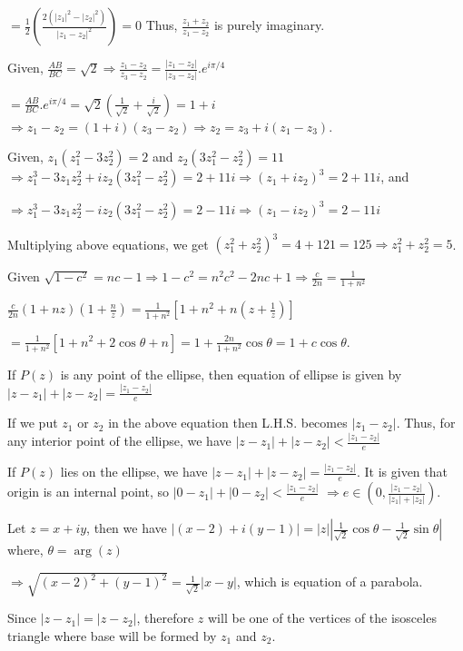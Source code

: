  $= \frac{1}{2}\left(\frac{2(|z_1|^2 - |z_2|^2)}{|z_1 - z_2|^2}\right) = 0$
  Thus, $\frac{z_1 + z_2}{z_1 - z_2}$ is purely imaginary.
\item Given, $\frac{AB}{BC} = \sqrt{2} \Rightarrow \frac{z_1 - z_2}{z_3 - z_2} = \frac{|z_1 - z_2|}{|z_3 -
  z_2|}.e^{i\pi/4}$

  $= \frac{AB}{BC}.e^{i\pi/4} = \sqrt{2}\left(\frac{1}{\sqrt{2}} + \frac{i}{\sqrt{2}}\right) = 1 + i$
  $\Rightarrow z_1 - z_2 = (1 + i)(z_3 - z_2) \Rightarrow z_2 = z_3 + i(z_1 - z_3)$.
\item Given, $z_1(z_1^2 - 3z_2^2) = 2$ and $z_2(3z_1^2 - z_2^2) = 11$
  $\Rightarrow z_1^3 - 3z_1z_2^2 + iz_2(3z_1^2 - z_2^2) = 2 + 11i \Rightarrow (z_1 + iz_2)^3 = 2 + 11i$, and

  $\Rightarrow z_1^3 - 3z_1z_2^2 - iz_2(3z_1^2 - z_2^2) = 2 - 11i \Rightarrow (z_1 - iz_2)^3 = 2 - 11i$

  Multiplying above equations, we get
  $(z_1^2 + z_2^2)^3 = 4 + 121 = 125 \Rightarrow z_1^2 + z_2^2 = 5$.
\item Given $\sqrt{1 - c^2} = nc - 1 \Rightarrow 1 - c^2 = n^2c^2 - 2nc + 1 \Rightarrow \frac{c}{2n} =
  \frac{1}{1 + n^2}$

  $\frac{c}{2n}(1 + nz)\left(1 + \frac{n}{z}\right) = \frac{1}{1 + n^2}\left[1 + n^2 + n\left(z +
    \frac{1}{z}\right)\right]$

  $= \frac{1}{1 + n^2}\left[1 + n^2 + 2\cos\theta + n\right] = 1 + \frac{2n}{1 + n^2}\cos\theta = 1 +
  c\cos\theta$.
\item If $P(z)$ is any point of the ellipse, then equation of ellipse is given by
  $|z - z_1| + |z- z_2| = \frac{|z_1 - z_2|}{e}$

  If we put $z_1$ or $z_2$ in the above equation then L.H.S. becomes $|z_1 - z_2|$.
  Thus, for any interior point of the ellipse, we have $|z - z_1| + |z - z_2| < \frac{|z_1 - z_2|}{e}$

  If $P(z)$ lies on the ellipse, we have $|z - z_1| + |z- z_2| = \frac{|z_1 - z_2|}{e}$.
  It is given that origin is an internal point, so
  $|0 - z_1| + |0 - z_2| < \frac{|z_1 - z_2|}{e}$
  $\Rightarrow e\in\left(0, \frac{|z_1 - z_2|}{|z_1| + |z_2|}\right)$.
\item Let $z = x + iy$, then we have
  $|(x - 2) + i(y - 1)| = |z|\left|\frac{1}{\sqrt{2}}\cos\theta - \frac{1}{\sqrt{2}}\sin\theta\right|$
  where, $\theta = \arg(z)$

  $\Rightarrow \sqrt{(x - 2)^2 + (y - 1)^2} = \frac{1}{\sqrt{2}}|x - y|$,
  which is equation of a parabola.
\item Since $|z - z_1| = |z - z_2|$, therefore $z$ will be one of the vertices of the isosceles triangle
  where base will be formed by $z_1$ and $z_2$.

